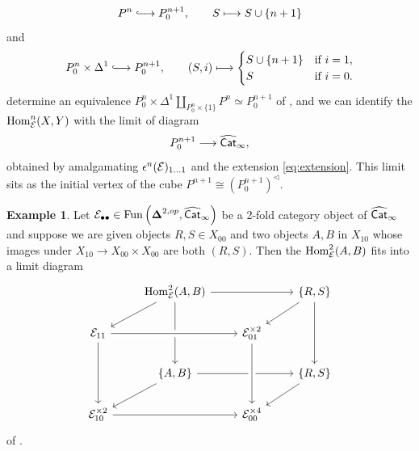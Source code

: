 \documentclass[10pt, reqno, twoside
, final
]{amsart}
\numberwithin{equation}{subsection}%
\theoremstyle{definition}
\theoremstyle{definition}
\theoremstyle{definition}
\theoremstyle{definition}
\theoremstyle{definition}
\theoremstyle{definition}
\theoremstyle{definition}
\theoremstyle{definition}
\theoremstyle{definition}
\theoremstyle{plain}
\theoremstyle{definition}
\theoremstyle{plain}
\theoremstyle{definition}
\theoremstyle{plain}
\theoremstyle{definition}
\theoremstyle{definition}
\theoremstyle{plain}
\theoremstyle{plain}
\theoremstyle{definition}
\newtheorem{ex}[defn]{Example}
\theoremstyle{plain}
\theoremstyle{plain}
\theoremstyle{plain}
\begin{document}
\[ P^n\hooklongrightarrow P_0^{n+1},\qquad S\longmapsto S\cup \{n+1\}\] 
and
\[ P_0^n\times \Delta^1\hooklongrightarrow P_0^{n+1},\qquad(S,i)\longmapsto \begin{cases}
   S\cup \{n+1\} & \text{if } i=1, \\
    S & \text{if }i=0 .  
\end{cases}  \]
determine an equivalence $ P^n_0\times\Delta^1\coprod_{P^n_0\times\{1\}}P^n\simeq P_0^{n+1}$ of \infcatst, and we can identify the \infcat $\mathrm{Hom}^n_{\mathcal{E}}(X,Y)$ with the limit of diagram 
\[ P^{n+1}_0\longrightarrow \widehat{\mathsf{Cat}}_{\infty}, \]
obtained by amalgamating $\epsilon^n(\mathcal{E})_{1\ldots 1}$ and the extension \eqref{eq:extension}. This limit sits as the initial vertex of the cube $P^{n+1}\cong \left(P^{n+1}_0\right)^{\lhd}$.
\begin{ex}
Let $\mathcal{E}_{\bullet\bullet}\in \mathrm{Fun}\left(\boldsymbol{\Delta}^{2,op},\widehat{\mathsf{Cat}}_{\infty}\right)$ be a 2-fold category object of $\widehat{\mathsf{Cat}}_{\infty}$ and suppose we are given objects $R,S \in X_{00}$ and two objects $A,B$ in $X_{10}$ whose images under $X_{10}\rightarrow X_{00}\times X_{00}$ are both $(R,S)$. Then the \infcat $\mathrm{Hom}^2_{\mathcal{E}}(A,B)$ fits into a limit diagram 
\[
\begin{tikzcd}
& \Hom^2_{\icate}(A,B)\arrow[rr] \arrow[dd] \ar[dl] & & \{R,S\} \arrow[dl]\arrow[dd] \\
\icate_{11}  \arrow[rr,crossing over] \arrow[dd] & & \icate_{01}^{\times 2}   \\
&\{A,B\}\arrow[dl]  \arrow[rr] & & \{R,S\} \arrow[dl]\\
\icate_{10}^{\times 2}\arrow[rr] & & \icate_{00}^{\times 4}\arrow[from=uu, crossing over]
\end{tikzcd}
\]
of \infcatst.
\end{ex}
\end{document}
